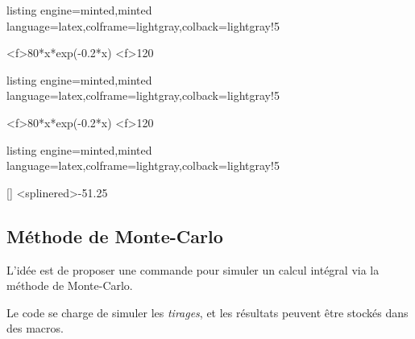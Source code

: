 \documentclass[11pt,a4paper]{ltxdoc}
\begin{document}
\begin{tcblisting}{listing engine=minted,minted language=latex,colframe=lightgray,colback=lightgray!5}
\begin{GraphiqueTikz}
  [x=0.66cm,y=0.033cm,Xmin=0,Xmax=21,Xgrille=2,Xgrilles=1,
  Ymin=0,Ymax=160,Ygrille=20,Ygrilles=10]
  \DefinirCourbe[Couleur=red,Nom=cf,Debut=1,Fin=20,Trace]<f>{80*x*exp(-0.2*x)}
  \RepresenterMethodeIntegrale
  [Methode=RectanglesMilieu,Couleur=yellow,NbSubDiv=25]<f>{1}{20}
\end{GraphiqueTikz}
\end{tcblisting}

\begin{tcblisting}{listing engine=minted,minted language=latex,colframe=lightgray,colback=lightgray!5}
\begin{GraphiqueTikz}
  [x=0.66cm,y=0.033cm,Xmin=0,Xmax=21,Xgrille=2,Xgrilles=1,
  Ymin=0,Ymax=160,Ygrille=20,Ygrilles=10]
  \DefinirCourbe[Couleur=red,Nom=cf,Debut=1,Fin=20,Trace]<f>{80*x*exp(-0.2*x)}
  \RepresenterMethodeIntegrale
  [Methode=Trapezes,Couleur=pink,Remplir=false]<f>{1}{20}
\end{GraphiqueTikz}
\end{tcblisting}

\begin{tcblisting}{listing engine=minted,minted language=latex,colframe=lightgray,colback=lightgray!5}
\begin{GraphiqueTikz}%
  [x=0.8cm,y=1cm,Xmin=-7,Xmax=4,Ymin=0,Ymax=5]
  [\lstsplineB]
  \DefinirCourbeSpline[Nom=splinered]{\lstsplineB}
  \TracerCourbeSpline[Couleur=red]{\lstsplineB}
  \RepresenterMethodeIntegrale%
    [Methode=RectanglesMilieu,Spline,Couleur=teal]%
    <splinered>{-5}{1.25}
\end{GraphiqueTikz}
\end{tcblisting}

\subsection{Méthode de Monte-Carlo}\label{montecarlo}

L'idée est de proposer une commande pour simuler un calcul intégral via la méthode de Monte-Carlo.

Le code se charge de simuler les \textit{tirages}, et les résultats peuvent être stockés dans des macros.
\end{document}

